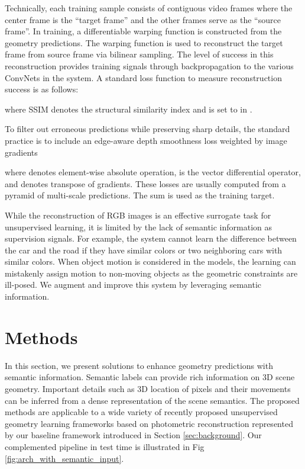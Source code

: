 \documentclass[10pt,twocolumn]{article}
\begin{document}
Technically, each training sample  consists of  contiguous video frames  where the center frame  is the ``target frame'' and the other frames serve as the ``source frame''. In training, a differentiable warping function  is constructed from the geometry predictions. The warping function is used to reconstruct the target frame  from source frame  via bilinear sampling. The level of success in this reconstruction provides training signals through backpropagation to the various ConvNets in the system. A standard loss function to measure reconstruction success is as follows:

where SSIM denotes the structural similarity index \cite{wang2004image} and  is set to  in \cite{yin2018geonet}.

To filter out erroneous predictions while preserving sharp details, the standard practice is to include an edge-aware depth smoothness loss  weighted by image gradients

where  denotes element-wise absolute operation,  is the vector differential operator, and  denotes transpose of gradients. These losses are usually computed from a pyramid of multi-scale predictions. The sum is used as the training target.

While the reconstruction of RGB images is an effective surrogate task for unsupervised learning, it is limited by the lack of semantic information as supervision signals. For example, the system cannot learn the difference between the car and the road if they have similar colors or two neighboring cars with similar colors. When object motion is considered in the models, the learning can mistakenly assign motion to non-moving objects as the geometric constraints are ill-posed. We augment and improve this system by leveraging semantic information. \section{Methods}
In this section, we present solutions to enhance geometry predictions with semantic information. Semantic labels can provide rich information on 3D scene geometry. Important details such as 3D location of pixels and their movements can be inferred from a dense representation of the scene semantics. The proposed methods are applicable to a wide variety of recently proposed unsupervised geometry learning frameworks based on photometric reconstruction \cite{zhou2017unsupervised, godard2017unsupervised, yin2018geonet} represented by our baseline framework introduced in Section \ref{sec:background}. Our complemented pipeline in test time is illustrated in Fig \ref{fig:arch_with_semantic_input}.
\end{document}
